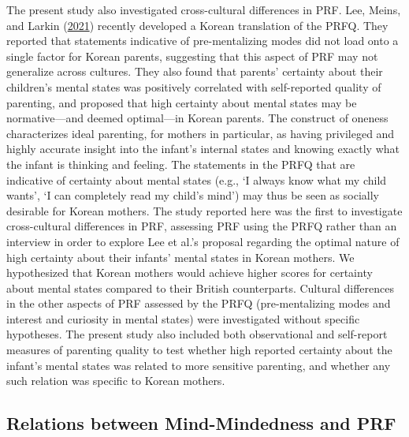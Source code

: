 \documentclass[
]{article}
\begin{document}
The present study also investigated cross-cultural differences in PRF. Lee, Meins, and Larkin (\protect\hyperlink{ref-Lee2021}{2021}) recently developed a Korean translation of the PRFQ. They reported that statements indicative of pre-mentalizing modes did not load onto a single factor for Korean parents, suggesting that this aspect of PRF may not generalize across cultures. They also found that parents' certainty about their children's mental states was positively correlated with self-reported quality of parenting, and proposed that high certainty about mental states may be normative---and deemed optimal---in Korean parents. The construct of oneness characterizes ideal parenting, for mothers in particular, as having privileged and highly accurate insight into the infant's internal states and knowing exactly what the infant is thinking and feeling. The statements in the PRFQ that are indicative of certainty about mental states (e.g., `I always know what my child wants', `I can completely read my child's mind') may thus be seen as socially desirable for Korean mothers. The study reported here was the first to investigate cross-cultural differences in PRF, assessing PRF using the PRFQ rather than an interview in order to explore Lee et al.'s proposal regarding the optimal nature of high certainty about their infants' mental states in Korean mothers. We hypothesized that Korean mothers would achieve higher scores for certainty about mental states compared to their British counterparts. Cultural differences in the other aspects of PRF assessed by the PRFQ (pre-mentalizing modes and interest and curiosity in mental states) were investigated without specific hypotheses. The present study also included both observational and self-report measures of parenting quality to test whether high reported certainty about the infant's mental states was related to more sensitive parenting, and whether any such relation was specific to Korean mothers.

\hypertarget{relations-between-mind-mindedness-and-prf}{%
\subsection*{Relations between Mind-Mindedness and PRF}\label{relations-between-mind-mindedness-and-prf}}
\end{document}
